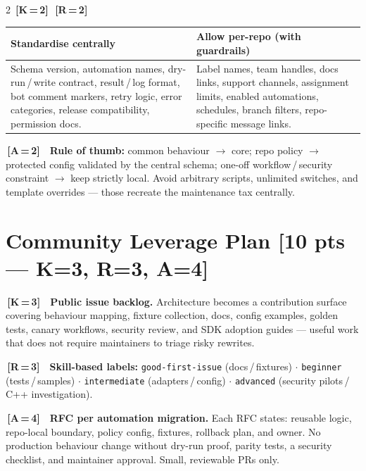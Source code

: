 \documentclass[9pt, a4paper]{article}
\newcommand{\ic}[2]{%
  {\colorbox{tag#1}{\color{white}\bfseries\fontsize{5.5}{6.5}\selectfont\,[#1\,=\,#2]\,}}%
}
\DeclareRobustCommand{\mb}[1]{%
  \texorpdfstring{\hfill{\fontsize{6.5}{7}\selectfont\color{hieroGray}[#1]}}{}%
}
\newcommand{\tsize}{\fontsize{7.8}{9.5}\selectfont}
\begin{document}
\begin{multicols}{2}
\ic{K}{2}\ic{R}{2}

\vspace{1pt}
{\tsize
\begin{tabularx}{\linewidth}{@{}XX@{}}
\toprule
\textbf{Standardise centrally} & \textbf{Allow per-repo (with guardrails)} \\
\midrule
Schema version, automation names, dry-run\,/\,write contract, result\,/\,log format,
bot comment markers, retry logic, error categories, release compatibility, permission docs.
&
Label names, team handles, docs links, support channels, assignment limits, enabled
automations, schedules, branch filters, repo-specific message links. \\
\bottomrule
\end{tabularx}}

\begin{invariantbox}
\fontsize{7.5}{9}\selectfont
\ic{A}{2}\ \textbf{Rule of thumb:} common behaviour $\to$ core; repo policy $\to$ protected
config validated by the central schema; one-off workflow\,/\,security constraint $\to$ keep
strictly local. Avoid arbitrary scripts, unlimited switches, and template overrides —
those recreate the maintenance tax centrally.
\end{invariantbox}

\section{Community Leverage Plan \mb{10 pts — K=3, R=3, A=4}}

\ic{K}{3}\ \textbf{Public issue backlog.} Architecture becomes a contribution surface
covering behaviour mapping, fixture collection, docs, config examples, golden tests, canary
workflows, security review, and SDK adoption guides — useful work that does not require
maintainers to triage risky rewrites.

\ic{R}{3}\ \textbf{Skill-based labels:} \texttt{good-first-issue} (docs\,/\,fixtures)
$\cdot$ \texttt{beginner} (tests\,/\,samples) $\cdot$ \texttt{intermediate}
(adapters\,/\,config) $\cdot$ \texttt{advanced} (security pilots\,/\,C++ investigation).

\ic{A}{4}\ \textbf{RFC per automation migration.} Each RFC states: reusable logic,
repo-local boundary, policy config, fixtures, rollback plan, and owner. No production
behaviour change without dry-run proof, parity tests, a security checklist, and maintainer
approval. Small, reviewable PRs only.


\end{multicols}
\end{document}
